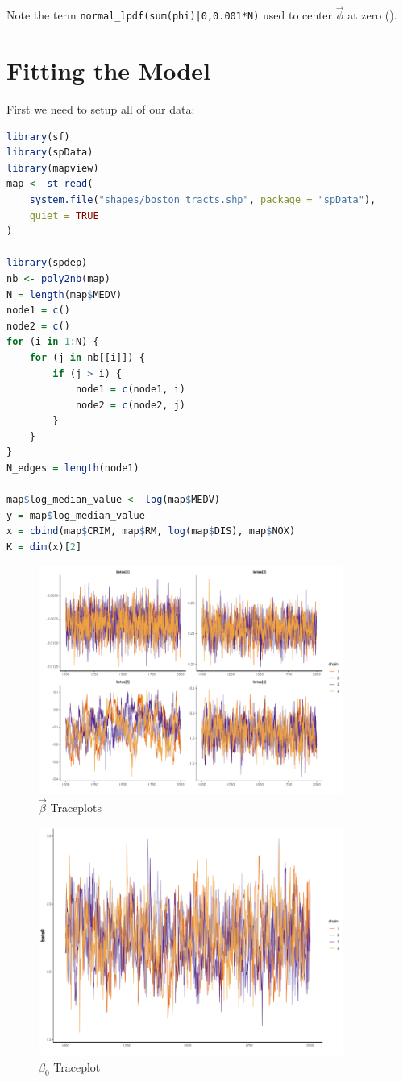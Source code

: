 \documentclass[11pt]{article}
\begin{document}
Note the term \verb+normal_lpdf(sum(phi)|0,0.001*N)+ used to center $\vec{\phi}$ at zero (\cite{bymstan}). 

\section{Fitting the Model}

First we need to setup all of our data:

\begin{lstlisting}[language=R, basicstyle=\small]
library(sf)
library(spData)
library(mapview)
map <- st_read(
    system.file("shapes/boston_tracts.shp", package = "spData"), 
    quiet = TRUE
)

library(spdep)
nb <- poly2nb(map)
N = length(map$MEDV)
node1 = c()
node2 = c()
for (i in 1:N) {
    for (j in nb[[i]]) {
        if (j > i) {
            node1 = c(node1, i)
            node2 = c(node2, j)
        }
    }
}
N_edges = length(node1)

map$log_median_value <- log(map$MEDV)
y = map$log_median_value
x = cbind(map$CRIM, map$RM, log(map$DIS), map$NOX)
K = dim(x)[2]
\end{lstlisting}


\begin{figure}[h!] 
	\centering
  \includegraphics[height=75mm]{traceplot_betas.png}
  \caption{$\vec{\beta}$ Traceplots}
  \label{fig:tbetas}
\end{figure}

\begin{figure}[h!] 
	\centering
  \includegraphics[height=75mm]{traceplot_beta0.png}
  \caption{$\beta_0$ Traceplot}
  \label{fig:tbeta0}
\end{figure}
\end{document}
